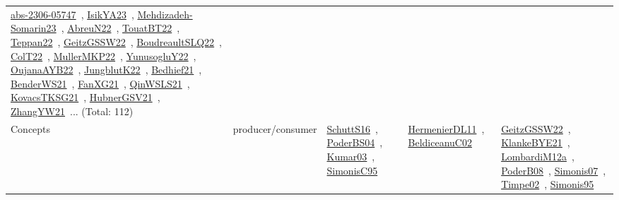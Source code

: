{\begin{longtable}{lp{3cm}>{\raggedright\arraybackslash}p{6cm}>{\raggedright\arraybackslash}p{6cm}>{\raggedright\arraybackslash}p{8cm}}
\href{works/abs-2306-05747.pdf}{abs-2306-05747}~\cite{abs-2306-05747}, \href{works/IsikYA23.pdf}{IsikYA23}~\cite{IsikYA23}, \href{works/Mehdizadeh-Somarin23.pdf}{Mehdizadeh-Somarin23}~\cite{Mehdizadeh-Somarin23}, \href{works/AbreuN22.pdf}{AbreuN22}~\cite{AbreuN22}, \href{works/TouatBT22.pdf}{TouatBT22}~\cite{TouatBT22}, \href{works/Teppan22.pdf}{Teppan22}~\cite{Teppan22}, \href{works/GeitzGSSW22.pdf}{GeitzGSSW22}~\cite{GeitzGSSW22}, \href{works/BoudreaultSLQ22.pdf}{BoudreaultSLQ22}~\cite{BoudreaultSLQ22}, \href{works/ColT22.pdf}{ColT22}~\cite{ColT22}, \href{works/MullerMKP22.pdf}{MullerMKP22}~\cite{MullerMKP22}, \href{works/YunusogluY22.pdf}{YunusogluY22}~\cite{YunusogluY22}, \href{works/OujanaAYB22.pdf}{OujanaAYB22}~\cite{OujanaAYB22}, \href{works/JungblutK22.pdf}{JungblutK22}~\cite{JungblutK22}, \href{works/Bedhief21.pdf}{Bedhief21}~\cite{Bedhief21}, \href{works/BenderWS21.pdf}{BenderWS21}~\cite{BenderWS21}, \href{works/FanXG21.pdf}{FanXG21}~\cite{FanXG21}, \href{works/QinWSLS21.pdf}{QinWSLS21}~\cite{QinWSLS21}, \href{works/KovacsTKSG21.pdf}{KovacsTKSG21}~\cite{KovacsTKSG21}, \href{works/HubnerGSV21.pdf}{HubnerGSV21}~\cite{HubnerGSV21}, \href{works/ZhangYW21.pdf}{ZhangYW21}~\cite{ZhangYW21}... (Total: 112)\\
Concepts & producer/consumer & \href{works/SchuttS16.pdf}{SchuttS16}~\cite{SchuttS16}, \href{works/PoderBS04.pdf}{PoderBS04}~\cite{PoderBS04}, \href{works/Kumar03.pdf}{Kumar03}~\cite{Kumar03}, \href{works/SimonisC95.pdf}{SimonisC95}~\cite{SimonisC95} & \href{works/HermenierDL11.pdf}{HermenierDL11}~\cite{HermenierDL11}, \href{works/BeldiceanuC02.pdf}{BeldiceanuC02}~\cite{BeldiceanuC02} & \href{works/GeitzGSSW22.pdf}{GeitzGSSW22}~\cite{GeitzGSSW22}, \href{works/KlankeBYE21.pdf}{KlankeBYE21}~\cite{KlankeBYE21}, \href{works/LombardiM12a.pdf}{LombardiM12a}~\cite{LombardiM12a}, \href{works/PoderB08.pdf}{PoderB08}~\cite{PoderB08}, \href{works/Simonis07.pdf}{Simonis07}~\cite{Simonis07}, \href{works/Timpe02.pdf}{Timpe02}~\cite{Timpe02}, \href{works/Simonis95.pdf}{Simonis95}~\cite{Simonis95}\\

\end{longtable}}
